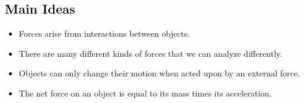 \documentclass[]{article}
\begin{document}
\newpage
\begin{TeacherMargin}
	
\end{TeacherMargin}
\begin{PresentSpace}
\section*{Main Ideas}
\begin{itemize}
	\item Forces arise from interactions between objects.
	\item There are many different kinds of forces that we can analyze differently.
	\item Objects can only change their motion when acted upon by an external force.
	\item The net force on an object is equal to its mass times its acceleration.
\end{itemize}
\end{PresentSpace}
\end{document}
